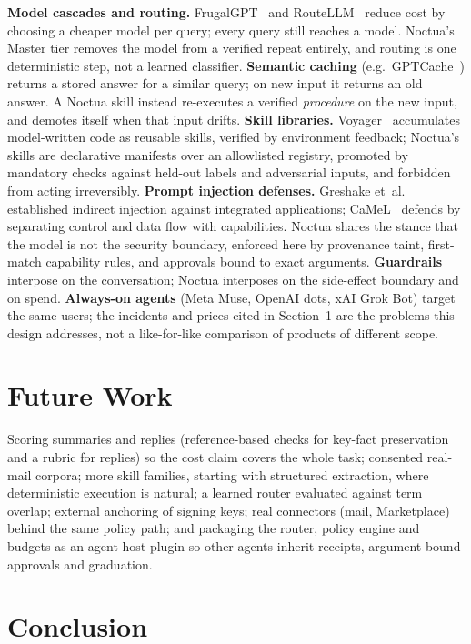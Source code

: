 \documentclass[11pt]{article}
\begin{document}
\textbf{Model cascades and routing.} FrugalGPT~\cite{frugal} and RouteLLM~\cite{routellm} reduce cost by choosing a
cheaper model per query; every query still reaches a model. Noctua's Master tier removes the model from a verified
repeat entirely, and routing is one deterministic step, not a learned classifier. \textbf{Semantic caching}
(e.g.\ GPTCache~\cite{gptcache}) returns a stored answer for a similar query; on new input it returns an old answer.
A Noctua skill instead re-executes a verified \emph{procedure} on the new input, and demotes itself when that input
drifts. \textbf{Skill libraries.} Voyager~\cite{voyager} accumulates model-written code as reusable skills, verified
by environment feedback; Noctua's skills are declarative manifests over an allowlisted registry, promoted by mandatory
checks against held-out labels and adversarial inputs, and forbidden from acting irreversibly. \textbf{Prompt
injection defenses.} Greshake et~al.~\cite{greshake} established indirect injection against integrated applications;
CaMeL~\cite{camel} defends by separating control and data flow with capabilities. Noctua shares the stance that the
model is not the security boundary, enforced here by provenance taint, first-match capability rules, and approvals
bound to exact arguments. \textbf{Guardrails}~\cite{nemo} interpose on the conversation; Noctua interposes on the
side-effect boundary and on spend. \textbf{Always-on agents} (Meta Muse, OpenAI dots, xAI Grok Bot) target the same
users; the incidents and prices cited in Section~1 are the problems this design addresses, not a like-for-like
comparison of products of different scope.

\section{Future Work}

Scoring summaries and replies (reference-based checks for key-fact preservation and a rubric for replies) so the
cost claim covers the whole task; consented real-mail corpora; more skill families, starting with structured
extraction, where deterministic execution is natural; a learned router evaluated against term overlap; external
anchoring of signing keys; real connectors (mail, Marketplace) behind the same policy path; and packaging the router,
policy engine and budgets as an agent-host plugin so other agents inherit receipts, argument-bound approvals and
graduation.

\section{Conclusion}
\end{document}
